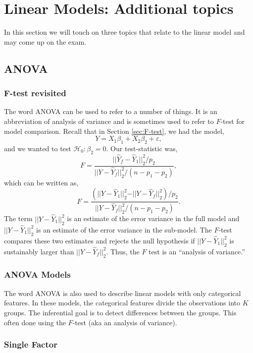 \section{Linear Models: Additional topics}

In this section we will touch on three topics that relate to the linear model and may come up on the exam.

\subsection{ANOVA}

\subsubsection*{F-test revisited}

The word ANOVA can be used to refer to a number of things. It is an abbreviation of analysis of variance and is sometimes used to refer to $F$-test for model comparison. Recall that in  Section \ref{sec:F-test}, we had the model,
\[Y = X_1\beta_1 + X_2\beta_2 + \varepsilon, \]
and we wanted to test $\mathcal{H}_0: \beta_2 = 0$. Our test-statistic was,
\[F = \frac{\vert \vert  \hat{Y}_f -\hat{Y}_1  \vert \vert_2^2/p_2}{\vert \vert Y - \hat{Y}_f  \vert \vert_2^2/(n-p_1-p_2)}, \]
which can be written as,
\[F =  \frac{(\vert \vert  Y -\hat{Y}_1  \vert \vert_2^2 - \vert \vert Y - \hat{Y}_f \vert \vert_2^2 )/p_2}{\vert \vert Y - \hat{Y}_f  \vert \vert_2^2/(n-p_1-p_2)}. \]
The term $\vert \vert Y-\hat{Y}_1 \vert \vert_2^2$ is an estimate of the error variance in the full model and $\vert \vert Y-\hat{Y}_1 \vert \vert_2^2$ is an estimate of the error variance in the sub-model. The $F$-test compares these two estimates and rejects the null hypothesis if $\vert \vert Y - \hat{Y}_1 \vert \vert_2^2$ is sustainably larger than $\vert \vert Y-\hat{Y}_f \vert \vert_2^2$. Thus, the $F$ test is an ``analysis of variance.''

\subsubsection*{ANOVA Models}

The word ANOVA is also used to describe linear models with only categorical features. In these models, the categorical features divide the observations into $K$ groups. The inferential goal is to detect differences between the groups. This often done using the $F$-test (aka an analysis of variance).

\subsubsection*{Single Factor}

